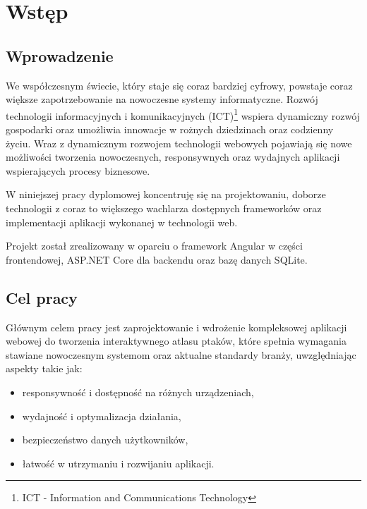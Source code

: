 %


\chapter*{Wstęp}

\section*{Wprowadzenie}

We współczesnym świecie, który staje się coraz bardziej cyfrowy, powstaje coraz większe zapotrzebowanie na nowoczesne systemy informatyczne.
Rozwój technologii informacyjnych i komunikacyjnych (ICT)\footnote{ICT - Information and Communications Technology} wspiera dynamiczny rozwój gospodarki oraz umożliwia innowacje w rożnych dziedzinach oraz codzienny życiu.
Wraz z dynamicznym rozwojem technologii webowych pojawiają się nowe możliwości tworzenia nowoczesnych, responsywnych oraz wydajnych aplikacji wspierających procesy biznesowe.

W niniejszej pracy dyplomowej koncentruję się na projektowaniu, doborze technologii z coraz to większego wachlarza dostępnych frameworków oraz implementacji aplikacji wykonanej w technologii web.

Projekt został zrealizowany w oparciu o framework Angular w części frontendowej, ASP.NET Core dla backendu oraz bazę danych SQLite.

\section*{Cel pracy}

Głównym celem pracy jest zaprojektowanie i wdrożenie kompleksowej aplikacji webowej do tworzenia interaktywnego atlasu ptaków, które spełnia wymagania stawiane nowoczesnym systemom oraz aktualne standardy branży, uwzględniając aspekty takie jak:
\begin{itemize}
    \item responsywność i dostępność na różnych urządzeniach,
    \item wydajność i optymalizacja działania,
    \item bezpieczeństwo danych użytkowników,
    \item łatwość w utrzymaniu i rozwijaniu aplikacji.
\end{itemize}

